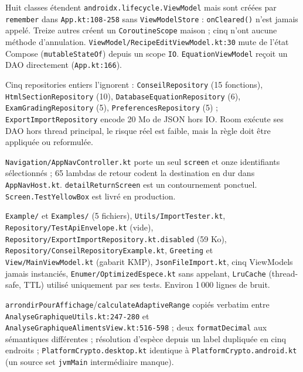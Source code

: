 \documentclass[11pt,a4paper]{article}
\newcommand{\fichier}[1]{\texttt{\small #1}}
\newcommand{\code}[1]{\texttt{#1}}
\newcommand{\sev}[1]{\textbf{#1}}
\begin{document}
\begin{description}[style=nextline]
\item[\sev{Majeur} --- Cycle de vie des ViewModels incohérent.]
  Huit classes étendent \code{androidx.lifecycle.ViewModel} mais sont créées par \code{remember}
  dans \fichier{App.kt:108-258} sans \code{ViewModelStore} : \code{onCleared()} n'est jamais
  appelé. Treize autres créent un \code{CoroutineScope} maison ; cinq n'ont aucune méthode
  d'annulation. \fichier{ViewModel/RecipeEditViewModel.kt:30} mute de l'état Compose
  (\code{mutableStateOf}) depuis un scope \code{IO}. \code{EquationViewModel} reçoit un DAO
  directement (\fichier{App.kt:166}).

\item[\sev{Majeur} --- Règle \code{withContext(AppDispatchers.IO)} non suivie.]
  Cinq repositories entiers l'ignorent : \code{ConseilRepository} (15 fonctions),
  \code{HtmlSectionRepository} (10), \code{DatabaseEquationRepository} (6),
  \code{ExamGradingRepository} (5), \code{PreferencesRepository} (5) ; \code{ExportImportRepository}
  encode 20 Mo de JSON hors IO. Room exécute ses DAO hors thread principal, le risque réel est
  faible, mais la règle doit être appliquée ou reformulée.

\item[\sev{Majeur} --- Navigation sans pile.]
  \fichier{Navigation/AppNavController.kt} porte un seul \code{screen} et onze identifiants
  sélectionnés ; 65 lambdas de retour codent la destination en dur dans \fichier{AppNavHost.kt}.
  \code{detailReturnScreen} est un contournement ponctuel. \code{Screen.TestYellowBox} est livré
  en production.

\item[\sev{Mineur} --- Code mort.]
  \fichier{Example/} et \fichier{Examples/} (5 fichiers), \fichier{Utils/ImportTester.kt},
  \fichier{Repository/TestApiEnvelope.kt} (vide), \fichier{Repository/ExportImportRepository.kt.disabled}
  (59 Ko), \fichier{Repository/ConseilRepositoryExample.kt}, \code{Greeting} et
  \fichier{View/MainViewModel.kt} (gabarit KMP), \fichier{JsonFileImport.kt}, cinq ViewModels
  jamais instanciés, \fichier{Enumer/OptimizedEspece.kt} sans appelant, \code{LruCache} (thread-safe,
  TTL) utilisé uniquement par ses tests. Environ 1\,000 lignes de bruit.

\item[\sev{Mineur} --- Duplications.]
  \code{arrondirPourAffichage}/\code{calculateAdaptiveRange} copiés verbatim entre
  \fichier{AnalyseGraphiqueUtils.kt:247-280} et \fichier{AnalyseGraphiqueAlimentsView.kt:516-598} ;
  deux \code{formatDecimal} aux sémantiques différentes ; résolution d'espèce depuis un label
  dupliquée en cinq endroits ; \code{PlatformCrypto.desktop.kt} identique à
  \code{PlatformCrypto.android.kt} (un source set \code{jvmMain} intermédiaire manque).
\end{description}
\end{document}
